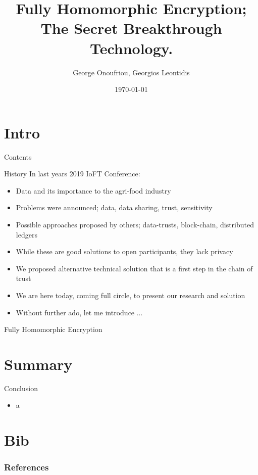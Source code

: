 \documentclass[aspectratio=169]{beamer}
\title{Fully Homomorphic Encryption; The Secret Breakthrough Technology.}
\author{George Onoufriou, Georgios Leontidis}
\date{\today}
\begin{document}

  \frame{\titlepage}

  \section{Intro}

    \begin{frame}{Contents}
    \end{frame}

    \begin{frame}{History}
      In last years 2019 IoFT Conference:
      \begin{itemize}
        \item Data and its importance to the agri-food industry
        \item Problems were announced; data, data sharing, trust, sensitivity
        \item Possible approaches proposed by others; data-trusts, block-chain, distributed ledgers
        \item While these are good solutions to open participants, they lack privacy
        \item We proposed alternative technical solution that is a first step in the chain of trust
        \item We are here today, coming full circle, to present our research and solution
        \item Without further ado, let me introduce ...
      \end{itemize}
    \end{frame}

    \begin{frame}{Fully Homomorphic Encryption}

    \end{frame}

  \section{Summary}

    \begin{frame}{Conclusion}
      \begin{itemize}
        \item a
      \end{itemize}
    \end{frame}

  \section{Bib}

    \begin{frame}[allowframebreaks]
      \frametitle{References}
      
    \end{frame}
\end{document}
